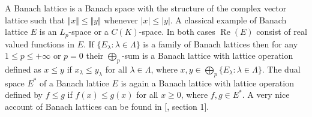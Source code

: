 A Banach lattice is a Banach space with the structure of the complex vector
lattice such that $\Vert x\Vert\leq \Vert y\Vert$ whenever $|x|\leq |y|$. A
classical example of Banach lattice $E$ is an $L_p$-space or a $C(K)$-space. In
both cases $\operatorname{Re}(E)$ consist of real valued functions in $E$. If 
$ \{E_\lambda:\lambda\in\Lambda \}$ is a family of Banach lattices then for any
$1\leq p\leq +\infty$ or $p=0$ their $\bigoplus_p$-sum is a Banach lattice with
lattice operation defined as $x\leq y$ if $x_\lambda\leq y_\lambda$ for all
$\lambda\in\Lambda$, where 
$x,y\in\bigoplus_p \{ E_\lambda:\lambda\in\Lambda \}$. 
The dual space $E^*$ of a Banach lattice $E$ is again a Banach lattice with
lattice operation defined by $f\leq g$ if $f(x)\leq g(x)$ for all $x\geq 0$,
where $f,g\in  E^*$. A very nice account of Banach lattices can be found in
[\cite{LaceyIsomThOfClassicBanSp}, section 1].

